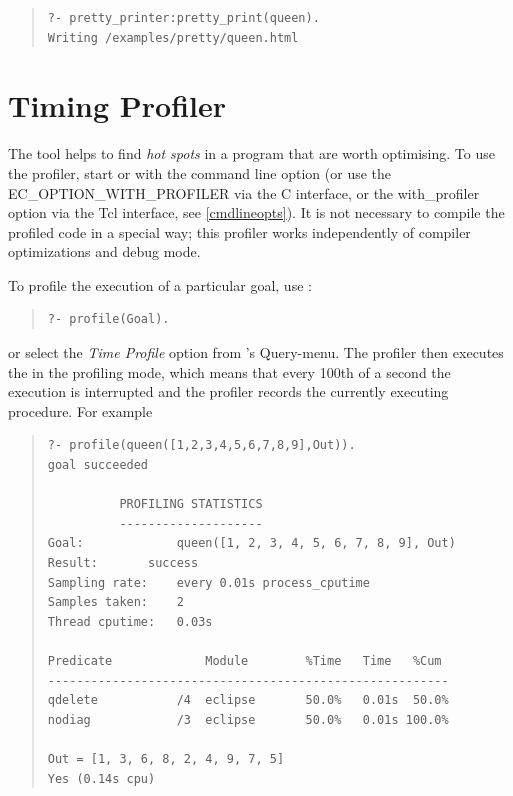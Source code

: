 \begin{quote}
\begin{verbatim}
?- pretty_printer:pretty_print(queen).
Writing /examples/pretty/queen.html
\end{verbatim}
\end{quote}

\vfill %


\section{Timing Profiler}

The  tool helps to find \emph{hot spots} in
a program that are worth optimising.
To use the profiler, start \eclipse{} or \tkeclipse{} with the
 command line option (or use the EC_OPTION_WITH_PROFILER
via the C interface, or the with_profiler option via the Tcl interface,
see \ref{cmdlineopts}).
It is not necessary to compile the profiled code in a special way;
this profiler works independently of compiler optimizations and debug mode.

To profile the execution of a particular goal, use
:
\begin{quote}
\begin{verbatim}
?- profile(Goal).
\end{verbatim}
\end{quote}
or select the \emph{Time Profile} option from \tkeclipse{}'s Query-menu.
The profiler then executes the  in
the profiling mode, which means that every 100th of a second the
execution is interrupted and the profiler records the currently
executing procedure.  For example
\begin{quote}
\begin{verbatim}
?- profile(queen([1,2,3,4,5,6,7,8,9],Out)).
goal succeeded

		  PROFILING STATISTICS
		  --------------------
Goal:             queen([1, 2, 3, 4, 5, 6, 7, 8, 9], Out)
Result:		  success
Sampling rate:	  every 0.01s process_cputime
Samples taken:	  2
Thread cputime:	  0.03s

Predicate             Module        %Time   Time   %Cum
--------------------------------------------------------
qdelete           /4  eclipse       50.0%   0.01s  50.0%
nodiag            /3  eclipse       50.0%   0.01s 100.0%

Out = [1, 3, 6, 8, 2, 4, 9, 7, 5]
Yes (0.14s cpu)
\end{verbatim}
\end{quote}

